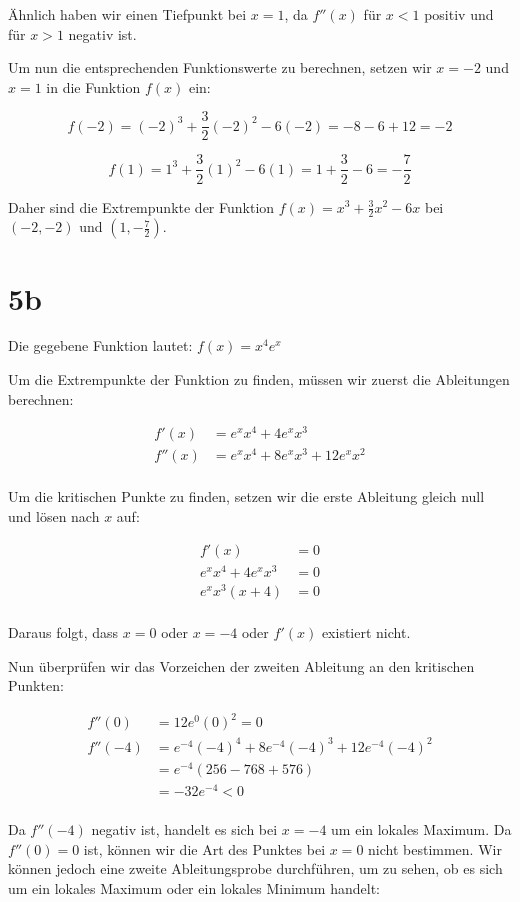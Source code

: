 \documentclass{book}
\begin{document}
Ähnlich haben wir einen Tiefpunkt bei $x=1$, da $f''(x)$ für $x<1$ positiv und für $x>1$ negativ ist.

Um nun die entsprechenden Funktionswerte zu berechnen, setzen wir $x=-2$ und $x=1$ in die Funktion $f(x)$ ein:

$$f(-2) = (-2)^3 + \frac{3}{2}(-2)^2 - 6(-2) = -8 - 6 + 12 = -2$$

$$f(1) = 1^3 + \frac{3}{2}(1)^2 - 6(1) = 1 + \frac{3}{2} - 6 = -\frac{7}{2}$$

Daher sind die Extrempunkte der Funktion $f(x) = x^3 + \frac{3}{2}x^2 - 6x$ bei $(-2,-2)$ und $(1,-\frac{7}{2})$.

\section*{5b}
Die gegebene Funktion lautet: $f(x) = x^4 e^x$

Um die Extrempunkte der Funktion zu finden, müssen wir zuerst die Ableitungen berechnen:

\begin{align*}
f'(x) &= e^x x^4 + 4 e^x x^3 \\
f''(x) &= e^x x^4 + 8 e^x x^3 + 12 e^x x^2 \\
\end{align*}

Um die kritischen Punkte zu finden, setzen wir die erste Ableitung gleich null und lösen nach $x$ auf:

\begin{align*}
f'(x) &= 0 \\
e^x x^4 + 4 e^x x^3 &= 0 \\
e^x x^3 (x+4) &= 0 \\
\end{align*}

Daraus folgt, dass $x = 0$ oder $x = -4$ oder $f'(x)$ existiert nicht.

Nun überprüfen wir das Vorzeichen der zweiten Ableitung an den kritischen Punkten:

\begin{align*}
f''(0) &= 12 e^0 (0)^2 = 0 \\
f''(-4) &= e^{-4} (-4)^4 + 8 e^{-4} (-4)^3 + 12 e^{-4} (-4)^2 \\
&= e^{-4} (256 - 768 + 576) \\
&= -32e^{-4} < 0 \\
\end{align*}

Da $f''(-4)$ negativ ist, handelt es sich bei $x=-4$ um ein lokales Maximum. Da $f''(0) = 0$ ist, können wir die Art des Punktes bei $x=0$ nicht bestimmen. Wir können jedoch eine zweite Ableitungsprobe durchführen, um zu sehen, ob es sich um ein lokales Maximum oder ein lokales Minimum handelt:
\end{document}
